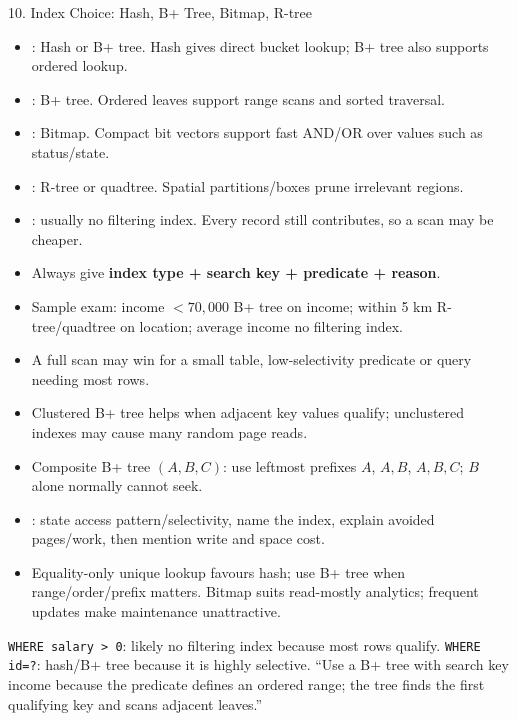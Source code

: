 \begin{solidtopic}{10. Index Choice: Hash, B+ Tree, Bitmap, R-tree}
\begin{itemize}
  \item {}: Hash or B+ tree. Hash gives direct bucket lookup; B+ tree also supports ordered lookup.
  \item {}: B+ tree. Ordered leaves support range scans and sorted traversal.
  \item {}: Bitmap. Compact bit vectors support fast AND/OR over values such as status/state.
  \item {}: R-tree or quadtree. Spatial partitions/boxes prune irrelevant regions.
  \item {}: usually no filtering index. Every record still contributes, so a scan may be cheaper.
\end{itemize}
\begin{itemize}
  \item Always give \textbf{index type + search key + predicate + reason}.
  \item Sample exam: income \(<70{,}000\) \arr B+ tree on income; within 5 km \arr R-tree/quadtree on location; average income \arr no filtering index.
  \item A full scan may win for a small table, low-selectivity predicate or query needing most rows.
  \item Clustered B+ tree helps when adjacent key values qualify; unclustered indexes may cause many random page reads.
  \item Composite B+ tree \((A,B,C)\): use leftmost prefixes \(A\), \(A,B\), \(A,B,C\); \(B\) alone normally cannot seek.
  \item {}: state access pattern/selectivity, name the index, explain avoided pages/work, then mention write and space cost.
  \item Equality-only unique lookup favours hash; use B+ tree when range/order/prefix matters. Bitmap suits read-mostly analytics; frequent updates make maintenance unattractive.
\end{itemize}
\worked \texttt{WHERE salary > 0}: likely no filtering index because most rows qualify. \texttt{WHERE id=?}: hash/B+ tree because it is highly selective.
\answer ``Use a B+ tree with search key income because the predicate defines an ordered range; the tree finds the first qualifying key and scans adjacent leaves.''
\end{solidtopic}


